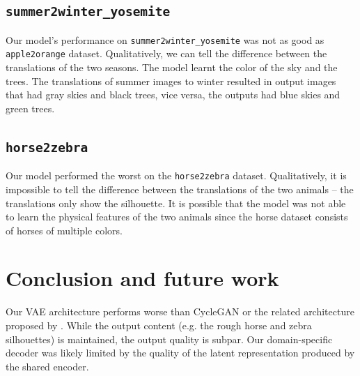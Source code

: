 \documentclass{article}
\begin{document}
\subsection{\texttt{summer2winter\_yosemite}}
Our model's performance on \texttt{summer2winter\_yosemite} was not as good as \texttt{apple2orange} dataset. Qualitatively, we can tell the difference between the translations of the two seasons. The model learnt the color of the sky and the trees. The translations of summer images to winter resulted in output images that had gray skies and black trees, vice versa, the outputs had blue skies and green trees.

\subsection{\texttt{horse2zebra}}
Our model performed the worst on the \texttt{horse2zebra} dataset. Qualitatively, it is impossible to tell the difference between the translations of the two animals – the translations only show the silhouette. It is possible that the model was not able to learn the physical features of the two animals since the horse dataset consists of horses of multiple colors.




\section{Conclusion and future work}
Our VAE architecture performs worse than CycleGAN or the related architecture proposed by \citet{liu}. While the output content (e.g. the rough horse and zebra silhouettes) is maintained, the output quality is subpar. Our domain-specific decoder was likely limited by the quality of the latent representation produced by the shared encoder.
\end{document}
